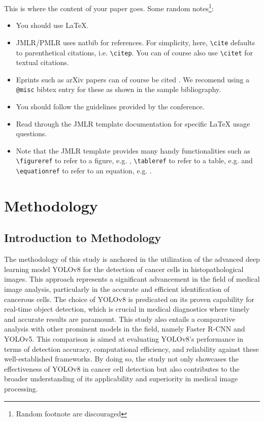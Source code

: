 \documentclass[anon]{midl} %
\begin{document}
This is where the content of your paper goes.  Some random
notes\footnote{Random footnote are discouraged}:
\begin{itemize}
\item You should use \LaTeX \cite{Lamport:Book:1989}.
\item JMLR/PMLR uses natbib for references. For simplicity, here, \verb|\cite|  defaults to
  parenthetical citations, i.e. \verb|\citep|. You can of course also
  use \verb|\citet| for textual citations.
\item Eprints such as arXiv papers can of course be cited \cite{Hinton:arXiv:2015:Distilling}. We recomend using a \verb|@misc| bibtex entry for these as shown in the sample bibliography.
\item You should follow the guidelines provided by the conference.
\item Read through the JMLR template documentation for specific \LaTeX
  usage questions.
\item Note that the JMLR template provides many handy functionalities
such as \verb|\figureref| to refer to a figure,
e.g. ,  \verb|\tableref| to refer to a table,
e.g.  and \verb|\equationref| to refer to an equation,
e.g. .
\end{itemize}

\section{Methodology}
\label{sec:methodology}

\subsection{Introduction to Methodology}
The methodology of this study is anchored in the utilization of the advanced deep learning model YOLOv8 for the detection of cancer cells in histopathological images. This approach represents a significant advancement in the field of medical image analysis, particularly in the accurate and efficient identification of cancerous cells. The choice of YOLOv8 is predicated on its proven capability for real-time object detection, which is crucial in medical diagnostics where timely and accurate results are paramount. This study also entails a comparative analysis with other prominent models in the field, namely Faster R-CNN and YOLOv5. This comparison is aimed at evaluating YOLOv8's performance in terms of detection accuracy, computational efficiency, and reliability against these well-established frameworks. By doing so, the study not only showcases the effectiveness of YOLOv8 in cancer cell detection but also contributes to the broader understanding of its applicability and superiority in medical image processing.
\end{document}
